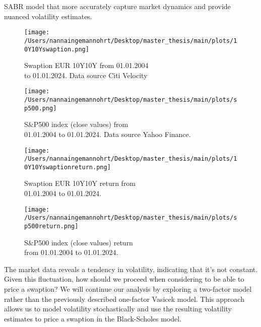 SABR model that more accurately capture market dynamics and provide nuanced volatility estimates.
\begin{figure}[H]
    \centering
    \begin{minipage}{0.5\textwidth}
        \texttt{[image: /Users/nannaingemannohrt/Desktop/master\_thesis/main/plots/10Y10Yswaption.png]}
        \caption{Swaption EUR 10Y10Y from 01.01.2004 \\ to 01.01.2024. Data source Citi Velocity }
        \label{10Y10Y dev}
    \end{minipage}\hfill 
    \begin{minipage}{0.5\textwidth}
        \texttt{[image: /Users/nannaingemannohrt/Desktop/master\_thesis/main/plots/sp500.png]}
        \caption{S$\&$P500 index (close values) from \\ 01.01.2004 to 01.01.2024. Data source Yahoo Finance. }
        \label{sp500 dev}
    \end{minipage}
\end{figure}

\begin{figure}[H]
    \centering
    \begin{minipage}{0.5\textwidth}
        \texttt{[image: /Users/nannaingemannohrt/Desktop/master\_thesis/main/plots/10Y10Yswaptionreturn.png]}
        \caption{Swaption EUR 10Y10Y return from  \\ 01.01.2004 to 01.01.2024.}
        \label{10Y10Y return}
    \end{minipage}\hfill 
    \begin{minipage}{0.5\textwidth}
        \texttt{[image: /Users/nannaingemannohrt/Desktop/master\_thesis/main/plots/sp500return.png]}
        \caption{S$\&$P500 index (close values) return  \\ from 01.01.2004 to 01.01.2024.}
        \label{sp500 return}
    \end{minipage}
\end{figure}
\noindent
The market data reveals a tendency in 
volatility, indicating that it's not constant. 
Given this fluctuation, how should we proceed when 
considering to be able to price a swaption? We will continue our 
analysis by exploring a two-factor model rather 
than the previously described one-factor Vasicek model. 
This approach allows us to model volatility 
stochastically and use the resulting volatility 
estimates to price a swaption in the Black-Scholes model. 
